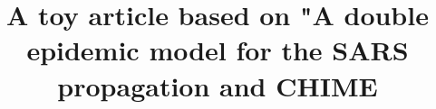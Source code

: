 \documentclass{bmcart}
\begin{document}
\begin{frontmatter}

\begin{fmbox}


\title{A toy article based on "A double epidemic model for the SARS propagation and CHIME}


\author[
   addressref={aff1},                   %
   noteref={n1},                        %
   email={ntw@maths.hku.hk}   %
]{ }
\author[
   addressref={aff2},
   email={Gabriel.Turinici@inria.fr}
]{ }

\author[
addressref={aff3},
email={adanchin@pasteur.fr}
]{ }

\address[id=aff1]{%
  , %
  ,                              %
}
\address[id=aff2]{%
  ,
}


\end{fmbox}
\end{frontmatter}
\end{document}
